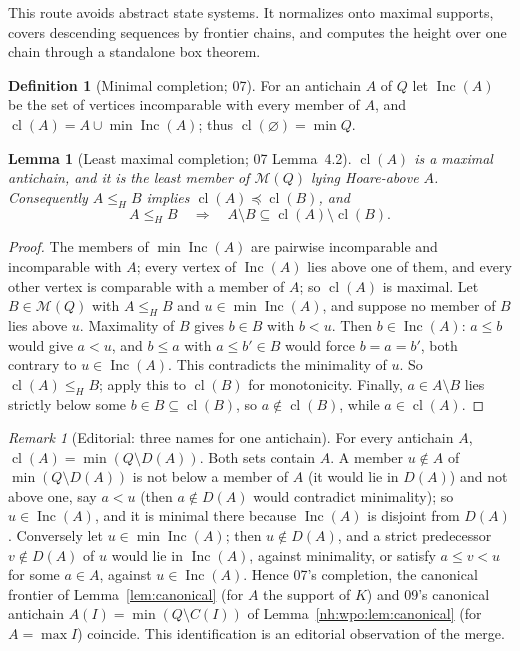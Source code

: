 \documentclass[11pt,a4paper]{article}
\newtheorem{lemma}[theorem]{Lemma}
\theoremstyle{definition}
\newtheorem{definition}[theorem]{Definition}
\theoremstyle{remark}
\newtheorem{remark}[theorem]{Remark}
\newcommand{\M}{\mathcal M}
\newcommand{\Inc}{\operatorname{Inc}}
\newcommand{\mcl}{\operatorname{cl}}
\begin{document}
This route avoids abstract state systems. It normalizes onto maximal supports,
covers descending sequences by frontier chains, and computes the height over one
chain through a standalone box theorem.

\begin{definition}[Minimal completion; 07]
For an antichain $A$ of $Q$ let $\Inc(A)$ be the set of vertices incomparable
with every member of $A$, and $\mcl(A)=A\cup\min\Inc(A)$; thus
$\mcl(\varnothing)=\min Q$.
\end{definition}

\begin{lemma}[Least maximal completion; 07 Lemma~4.2]\label{nh:lem:completion}
$\mcl(A)$ is a maximal antichain, and it is the least member of $\M(Q)$ lying
Hoare-above $A$. Consequently $A\le_HB$ implies $\mcl(A)\preceq\mcl(B)$, and
\begin{equation}\label{nh:eq:retirestrict}
 A\le_HB\quad\Longrightarrow\quad A\setminus B\subseteq\mcl(A)\setminus\mcl(B).
\end{equation}
\end{lemma}
\begin{proof}
The members of $\min\Inc(A)$ are pairwise incomparable and incomparable with
$A$; every vertex of $\Inc(A)$ lies above one of them, and every other vertex is
comparable with a member of $A$; so $\mcl(A)$ is maximal. Let $B\in\M(Q)$ with
$A\le_HB$ and $u\in\min\Inc(A)$, and suppose no member of $B$ lies above $u$.
Maximality of $B$ gives $b\in B$ with $b<u$. Then $b\in\Inc(A)$: $a\le b$ would
give $a<u$, and $b\le a$ with $a\le b'\in B$ would force $b=a=b'$, both contrary
to $u\in\Inc(A)$. This contradicts the minimality of $u$. So $\mcl(A)\le_HB$;
apply this to $\mcl(B)$ for monotonicity. Finally, $a\in A\setminus B$ lies
strictly below some $b\in B\subseteq\mcl(B)$, so $a\notin\mcl(B)$, while
$a\in\mcl(A)$.
\end{proof}

\begin{remark}[Editorial: three names for one antichain]\label{nh:rem:threenames}
For every antichain $A$, $\mcl(A)=\min(Q\setminus D(A))$. Both sets contain
$A$. A member $u\notin A$ of $\min(Q\setminus D(A))$ is not below a member of
$A$ (it would lie in $D(A)$) and not above one, say $a<u$ (then $a\notin D(A)$
would contradict minimality); so $u\in\Inc(A)$, and it is minimal there because
$\Inc(A)$ is disjoint from $D(A)$. Conversely let $u\in\min\Inc(A)$; then
$u\notin D(A)$, and a strict predecessor $v\notin D(A)$ of $u$ would lie in
$\Inc(A)$, against minimality, or satisfy $a\le v<u$ for some $a\in A$, against
$u\in\Inc(A)$. Hence 07's completion, the canonical frontier of Lemma~\ref{lem:canonical}
(for $A$ the support of $K$) and 09's canonical antichain
$A(I)=\min(Q\setminus C(I))$ of Lemma~\ref{nh:wpo:lem:canonical} (for $A=\max I$)
coincide. This identification is an editorial observation of the merge.
\end{remark}
\end{document}
